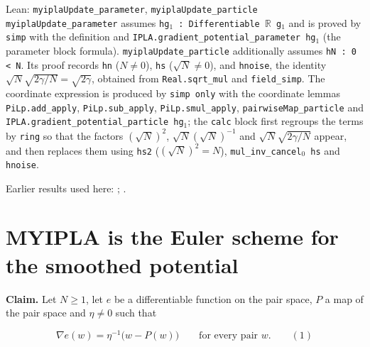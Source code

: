 \documentclass[11pt,a4paper]{article}
\begin{document}
\begin{leanbox}{Lean: \texttt{myiplaUpdate\_\allowbreak{}parameter}, \texttt{myiplaUpdate\_\allowbreak{}particle}}
\texttt{myipla\allowbreak{}Update\_\allowbreak{}parameter} assumes \texttt{hg\ensuremath{{}_{1}} : Differentiable \ensuremath{\mathbb R} g\ensuremath{{}_{1}}} and is proved by \texttt{simp} with the definition and \texttt{IPLA.\allowbreak{}gradient\_\allowbreak{}potential\_\allowbreak{}parameter hg\ensuremath{{}_{1}}} (the parameter block formula). \texttt{myipla\allowbreak{}Update\_\allowbreak{}particle} additionally assumes \texttt{h\allowbreak{}N : 0 < N}. Its proof records \texttt{hn} (\(N\ne0\)), \texttt{hs} (\(\sqrt N\ne0\)), and \texttt{hnoise}, the identity \(\sqrt N\sqrt{2\gamma/N}=\sqrt{2\gamma}\), obtained from \texttt{Real.\allowbreak{}sqrt\_\allowbreak{}mul} and \texttt{field\_\allowbreak{}simp}. The coordinate expression is produced by \texttt{simp only} with the coordinate lemmas \texttt{Pi\allowbreak{}Lp.\allowbreak{}add\_\allowbreak{}apply}, \texttt{Pi\allowbreak{}Lp.\allowbreak{}sub\_\allowbreak{}apply}, \texttt{Pi\allowbreak{}Lp.\allowbreak{}smul\_\allowbreak{}apply}, \texttt{pairwise\allowbreak{}Map\_\allowbreak{}particle} and \texttt{IPLA.\allowbreak{}gradient\_\allowbreak{}potential\_\allowbreak{}particle hg\ensuremath{{}_{1}}}; the \texttt{calc} block first regroups the terms by \texttt{ring} so that the factors \((\sqrt N)^2\), \(\sqrt N(\sqrt N)^{-1}\) and \(\sqrt N\sqrt{2\gamma/N}\) appear, and then replaces them using \texttt{hs2} (\((\sqrt N)^2=N\)), \texttt{mul\_\allowbreak{}inv\_\allowbreak{}cancel\ensuremath{{}_{0}} hs} and \texttt{hnoise}.
\end{leanbox}


Earlier results used here: \cite[Section~3.1.1]{LangevinLean2026IPLA}; \cite[Section~3.1.5]{LangevinLean2026IPLA}.

\section{\texorpdfstring{MYIPLA is the Euler scheme for the smoothed potential}{MYIPLA is the Euler scheme for the smoothed potential}}


\textbf{Claim.} Let \(N\ge1\), let \(e\) be a differentiable function on the pair space, \(P\) a map of the pair space and \(\eta\ne0\) such that


\[\nabla e(w)=\eta^{-1}\bigl(w-P(w)\bigr)\qquad\text{for every pair }w.\qquad(1)\]
\end{document}
